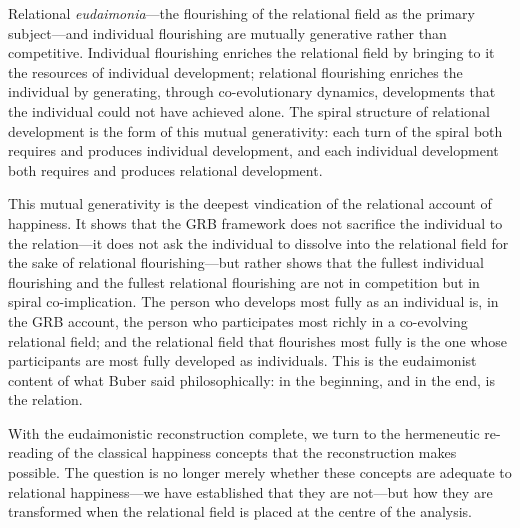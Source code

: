 \begin{claim}
Relational \emph{eudaimonia}---the flourishing of the relational field as the primary subject---and individual flourishing are mutually generative rather than competitive. Individual flourishing enriches the relational field by bringing to it the resources of individual development; relational flourishing enriches the individual by generating, through co-evolutionary dynamics, developments that the individual could not have achieved alone. The spiral structure of relational development is the form of this mutual generativity: each turn of the spiral both requires and produces individual development, and each individual development both requires and produces relational development.
\end{claim}

This mutual generativity is the deepest vindication of the relational account of happiness. It shows that the GRB framework does not sacrifice the individual to the relation---it does not ask the individual to dissolve into the relational field for the sake of relational flourishing---but rather shows that the fullest individual flourishing and the fullest relational flourishing are not in competition but in spiral co-implication. The person who develops most fully as an individual is, in the GRB account, the person who participates most richly in a co-evolving relational field; and the relational field that flourishes most fully is the one whose participants are most fully developed as individuals. This is the eudaimonist content of what Buber said philosophically: in the beginning, and in the end, is the relation.

With the eudaimonistic reconstruction complete, we turn to the hermeneutic re-reading of the classical happiness concepts that the reconstruction makes possible. The question is no longer merely whether these concepts are adequate to relational happiness---we have established that they are not---but how they are transformed when the relational field is placed at the centre of the analysis.

